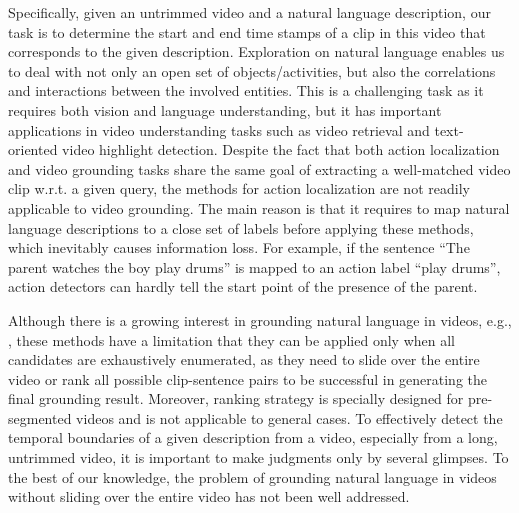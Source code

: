 \documentclass[letterpaper]{article} %
\begin{document}
Specifically, given an untrimmed video and a natural language description, our task is to determine the start and end time stamps of a clip in this video that corresponds to the given description. Exploration on natural language enables us to deal with not only an open set of objects/activities, but also the correlations and interactions between the involved entities. This is a challenging task as it requires both vision and language understanding, but it has important applications in video understanding tasks such as video retrieval and text-oriented video highlight detection. Despite the fact that both action localization and video grounding tasks share the same goal of extracting a well-matched video clip w.r.t. a given query, the methods for action localization are not readily applicable to video grounding. The main reason is that it requires to map natural language descriptions to a close set of labels before applying these methods, which inevitably causes information loss. For example, if the sentence ``The parent watches the boy play drums'' is mapped to an action label ``play drums'', action detectors can hardly tell the start point of the presence of the parent.

Although there is a growing interest in grounding natural language in videos, e.g., \cite{tall,mcn,retrieval_attentive}, these methods have a limitation that they can be applied only when all candidates are exhaustively enumerated, as they need to slide over the entire video or rank all possible clip-sentence pairs to be successful in generating the final grounding result.
Moreover, ranking strategy \cite{mcn} is specially designed for pre-segmented videos and is not applicable to general cases. To effectively detect the temporal boundaries of a given description from a video, especially from a long, untrimmed video, it is important to make judgments only by several glimpses. To the best of our knowledge, the problem of grounding natural language in videos without sliding over the entire video has not been well addressed.
\end{document}
